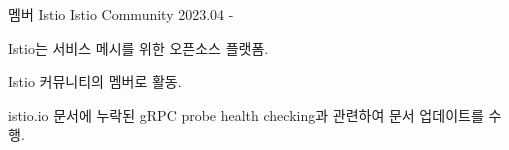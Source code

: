 \begin{cventries}
  \cventry
    {멤버} %
    {Istio} %
    {Istio Community} %
    {2023.04 - } %
    {
      \begin{cvitems} %
        \item {Istio는 서비스 메시를 위한 오픈소스 플랫폼.}
        \item {Istio 커뮤니티의 멤버로 활동.}
        \item {istio.io 문서에 누락된 gRPC probe health checking과 관련하여 문서 업데이트를 수행.}
      \end{cvitems}
    }

\end{cventries}

